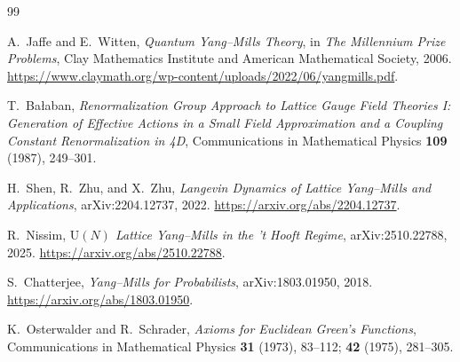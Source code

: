 \documentclass[11pt]{article}
\theoremstyle{remark}
\begin{document}
\begin{thebibliography}{99}

A.~Jaffe and E.~Witten,
\emph{Quantum Yang--Mills Theory},
in \emph{The Millennium Prize Problems},
Clay Mathematics Institute and American Mathematical Society, 2006.
\url{https://www.claymath.org/wp-content/uploads/2022/06/yangmills.pdf}.

T.~Ba\l aban,
\emph{Renormalization Group Approach to Lattice Gauge Field Theories I:
Generation of Effective Actions in a Small Field Approximation and a Coupling
Constant Renormalization in 4D},
Communications in Mathematical Physics \textbf{109} (1987), 249--301.

H.~Shen, R.~Zhu, and X.~Zhu,
\emph{Langevin Dynamics of Lattice Yang--Mills and Applications},
arXiv:2204.12737, 2022.
\url{https://arxiv.org/abs/2204.12737}.

R.~Nissim,
\emph{$\mathrm{U}(N)$ Lattice Yang--Mills in the 't Hooft Regime},
arXiv:2510.22788, 2025.
\url{https://arxiv.org/abs/2510.22788}.

S.~Chatterjee,
\emph{Yang--Mills for Probabilists},
arXiv:1803.01950, 2018.
\url{https://arxiv.org/abs/1803.01950}.

K.~Osterwalder and R.~Schrader,
\emph{Axioms for Euclidean Green's Functions},
Communications in Mathematical Physics \textbf{31} (1973), 83--112;
\textbf{42} (1975), 281--305.

\end{thebibliography}
\end{document}
